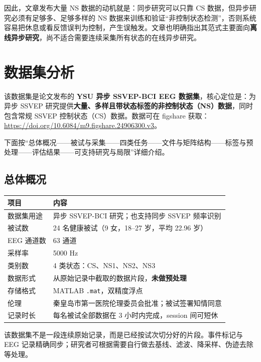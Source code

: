 \documentclass[12pt, a4paper]{ctexart}
\newcommand{\ttf}[1]{\texttt{#1}}
\begin{document}
因此，文章发布大量 NS 数据的动机就是：同步研究可以只靠 CS 数据，但异步研究必须有足够多、足够多样的 NS 数据来训练和验证``非控制状态检测''，否则系统容易把休息或看反馈误判为控制，产生误触发。文章也明确指出其范式主要面向\textbf{离线异步研究}，尚不适合需要连续采集所有状态的在线异步研究。

\section{数据集分析}

该数据集是论文发布的 \textbf{YSU 异步 SSVEP-BCI EEG 数据集}，核心定位是：为异步 SSVEP 研究提供\textbf{大量、多样且带状态标签的非控制状态（NS）数据}，同时包含常规 SSVEP 控制状态（CS）数据。数据可在 figshare 获取：\url{https://doi.org/10.6084/m9.figshare.24906300.v3}。

下面按``总体概况——被试与采集——四类任务——文件与矩阵结构——标签与预处理——评估结果——可支持研究与局限''详细介绍。

\subsection{总体概况}

\begin{table}[h]
\centering\small
\begin{tabularx}{\textwidth}{lY}
\toprule
\textbf{项目} & \textbf{内容} \\
\midrule
数据集用途 & 异步 SSVEP-BCI 研究；也支持同步 SSVEP 频率识别 \\
被试数 & 24 名健康被试（9 女，18--27 岁，平均 22.96 岁） \\
EEG 通道数 & 63 通道 \\
采样率 & 5000 Hz \\
类别数 & 4 类状态：CS、NS1、NS2、NS3 \\
数据形式 & 从原始记录中截取的数据片段，\textbf{未做预处理} \\
存储格式 & MATLAB \ttf{.mat}，双精度浮点 \\
伦理 & 秦皇岛市第一医院伦理委员会批准；被试签署知情同意 \\
记录时长 & 每名被试全部数据在 3 小时内完成，session 间可短休 \\
\bottomrule
\end{tabularx}
\end{table}

该数据集不是一段连续原始记录，而是已经按试次切分好的片段。事件标记与 EEG 记录精确同步；研究者可根据需要自行做去基线、滤波、降采样、伪迹去除等处理。
\end{document}
